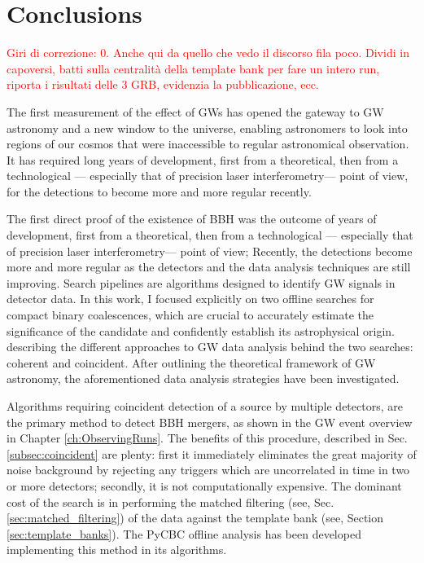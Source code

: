 \documentclass[binding=0.6cm, LaM]{sapthesis}
\newcommand{\fpg}[1]{\textcolor{red}{#1} }
\begin{document}
\chapter*{Conclusions}
\fpg{Giri di correzione: 0.}%
\fpg{Anche qui da quello che vedo il discorso fila poco.  Dividi in capoversi, batti sulla centralit\`a della template bank per fare un intero run, riporta i risultati delle 3 GRB, evidenzia la pubblicazione, ecc.}

	The first measurement of the effect of GWs has opened the gateway to GW astronomy 
	and a new window to the universe, enabling astronomers to look into regions of our cosmos 
	that were inaccessible to regular astronomical observation.
	It has required long years of development, first from a theoretical, 
	then from a technological — especially that of precision laser interferometry— point of view,
	for the detections to become more and more regular recently.
	
	The first direct proof of the existence of BBH was the outcome of years of development, 
	first from a theoretical, then from a technological — especially that of precision laser interferometry— point of view;
	Recently, the detections become more and more regular as the detectors and the data analysis techniques are still improving.
	Search pipelines are algorithms designed to identify GW signals in detector data.
	In this work, I focused explicitly on two offline searches for compact binary coalescences, 
	which are crucial to accurately estimate the significance of the candidate and confidently establish its astrophysical origin.
	describing the different approaches to GW data analysis behind the two searches: coherent and coincident.
	After outlining the theoretical framework of GW astronomy,
        the aforementioned data analysis strategies have been investigated.

	Algorithms requiring coincident detection of a source by multiple detectors,
        are the primary method to detect BBH mergers,
        as shown in the GW event overview in Chapter \ref{ch:ObservingRuns}.
        The benefits of this procedure, described in Sec.\ref{subsec:coincident} are plenty:
        first it immediately eliminates the great majority of noise background
        by rejecting any triggers which are uncorrelated in time in two or more detectors;
        secondly, it is not computationally expensive.
        The dominant cost of the search is in performing the matched filtering (see, Sec.\ref{sec:matched_filtering})
        of the data against the template bank (see, Section \ref{sec:template_banks}).
        The {\ttfamily PyCBC} offline analysis has been developed implementing this method in its algorithms.
\end{document}
